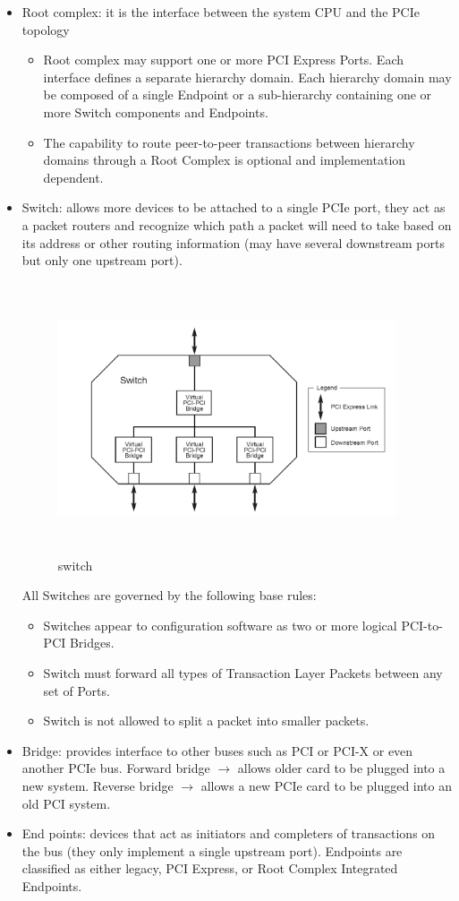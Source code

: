 \begin{itemize}
    \item  Root complex: it is the interface between the system CPU and the PCIe topology 
    \begin{itemize}
        \item  Root complex may support one or more PCI Express Ports. Each interface
defines a separate hierarchy domain. Each hierarchy domain may be
composed of a single Endpoint or a sub-hierarchy containing one or more
Switch components and Endpoints.
\item The capability to route peer-to-peer transactions between hierarchy
domains through a Root Complex is optional and implementation
dependent.
    \end{itemize}
    \item Switch: allows more devices to be attached to a single PCIe port, they act as a
packet routers and recognize which path a packet will need to take based on its
address or other routing information (may have several downstream ports but
only one upstream port).
\begin{figure}[H]
  \centering
  \includegraphics[width=100mm,height=80mm]{images/switch.png}
  \caption{switch}
  \label{lane}
\end{figure}
All Switches are governed by the following base rules:
\begin{itemize}
    \item Switches appear to configuration software as two or more logical PCI-to-PCI Bridges.
    \item Switch must forward all types of Transaction Layer Packets between any
set of Ports.
\item  Switch is not allowed to split a packet into smaller packets.
\end{itemize}
\item Bridge: provides interface to other buses such as PCI or PCI-X or even another
PCIe bus. \newline
Forward bridge $\longrightarrow$ allows older card to be plugged into a new system. \newline
Reverse bridge $\longrightarrow$ allows a new PCIe card to be plugged into an old PCI system.
\item End points: devices that act as initiators and completers of transactions on the
bus (they only implement a single upstream port). Endpoints are classified as
either legacy, PCI Express, or Root Complex Integrated Endpoints.
\end{itemize}
